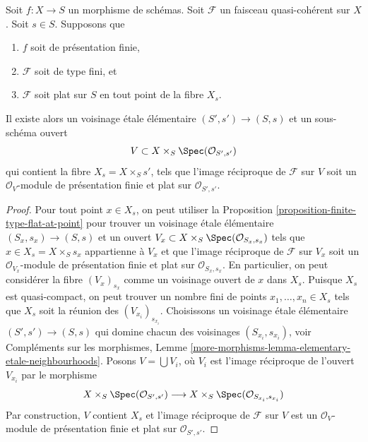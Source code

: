 \begin{lemma}
\label{lemma-finite-type-flat-along-fibre}
Soit $f : X \to S$ un morphisme de schémas.
Soit $\mathcal{F}$ un faisceau quasi-cohérent sur $X$.
Soit $s \in S$.
Supposons que
\begin{enumerate}
\item $f$ soit de présentation finie,
\item $\mathcal{F}$ soit de type fini, et
\item $\mathcal{F}$ soit plat sur $S$ en tout point de la fibre $X_s$.
\end{enumerate}
Il existe alors un voisinage \'etale élémentaire $(S', s') \to (S, s)$
et un sous-schéma ouvert
$$
V \subset X \times_S \Spec(\mathcal{O}_{S', s'})
$$
qui contient la fibre $X_s = X \times_S s'$, tels que l'image réciproque
de $\mathcal{F}$ sur $V$ soit un $\mathcal{O}_V$-module
de présentation finie et plat sur $\mathcal{O}_{S', s'}$.
\end{lemma}

\begin{proof}
Pour tout point $x \in X_s$, on peut utiliser la
Proposition \ref{proposition-finite-type-flat-at-point}
pour trouver un voisinage \'etale élémentaire $(S_x, s_x) \to (S, s)$
et un ouvert $V_x \subset X \times_S \Spec(\mathcal{O}_{S_x, s_x})$
tels que $x \in X_s = X \times_S s_x$ appartienne à $V_x$ et que
l'image réciproque de $\mathcal{F}$ sur $V_x$ soit un
$\mathcal{O}_{V_x}$-module de présentation finie et plat sur
$\mathcal{O}_{S_x, s_x}$. En particulier, on peut considérer la fibre
$(V_x)_{s_x}$ comme un voisinage ouvert de $x$ dans $X_s$.
Puisque $X_s$ est quasi-compact, on peut trouver un nombre fini de points
$x_1, \ldots, x_n \in X_s$ tels que $X_s$ soit la réunion
des $(V_{x_i})_{s_{x_i}}$. Choisissons un voisinage \'etale élémentaire
$(S' , s') \to (S, s)$ qui domine chacun des voisinages
$(S_{x_i}, s_{x_i})$, voir
Compléments sur les morphismes,
Lemme \ref{more-morphisms-lemma-elementary-etale-neighbourhoods}.
Posons $V = \bigcup V_i$, où $V_i$ est l'image réciproque de l'ouvert
$V_{x_i}$ par le morphisme
$$
X \times_S \Spec(\mathcal{O}_{S', s'})
\longrightarrow
X \times_S \Spec(\mathcal{O}_{S_{x_i}, s_{x_i}})
$$
Par construction, $V$ contient $X_s$ et l'image réciproque
de $\mathcal{F}$ sur $V$ est un $\mathcal{O}_V$-module
de présentation finie et plat sur $\mathcal{O}_{S', s'}$.
\end{proof}

